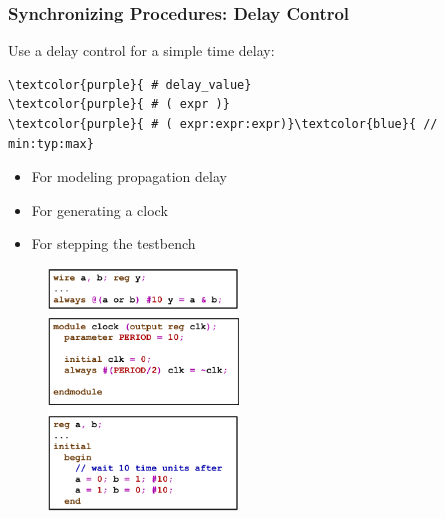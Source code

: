 \documentclass[t, notes, xcolor=table]{beamer}
\begin{document}
\begin{frame}[fragile]
\frametitle{Synchronizing Procedures: Delay Control}
\scriptsize{
\begin{multicols}{2}
Use a delay control for a simple time delay:
\begin{Verbatim}[commandchars=\\\{\}, tabsize=2]
\textcolor{purple}{	# delay_value}
\textcolor{purple}{	# ( expr )}
\textcolor{purple}{	# ( expr:expr:expr)}\textcolor{blue}{ // min:typ:max}
\end{Verbatim}
\begin{itemize}
\item For modeling propagation delay
\item For generating a clock
\item For stepping the testbench
\end{itemize}
\vfill
\columnbreak
\begin{figure}
    \includegraphics[width=0.45\textwidth]{img/09_sync_proc_delay.png}
\end{figure}
\end{multicols}
}
\end{frame}
\end{document}
